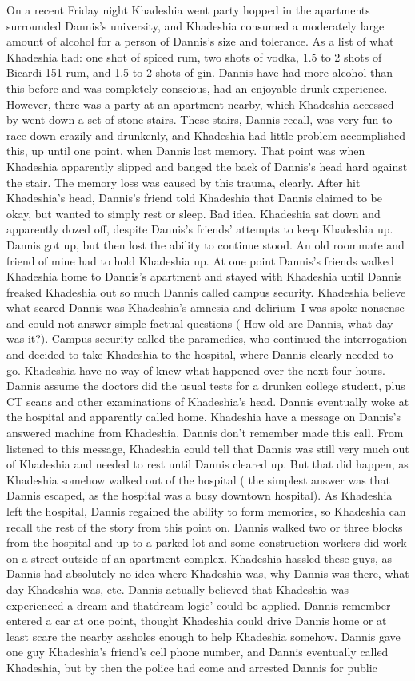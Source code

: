 \documentclass[12pt]{book}
\begin{document}
On a recent Friday night Khadeshia went party hopped in the apartments surrounded Dannis's university, and Khadeshia consumed a moderately large amount of alcohol for a person of Dannis's size and tolerance. As a list of what Khadeshia had: one shot of spiced rum, two shots of vodka, 1.5 to 2 shots of Bicardi 151 rum, and 1.5 to 2 shots of gin. Dannis have had more alcohol than this before and was completely conscious, had an enjoyable drunk experience. However, there was a party at an apartment nearby, which Khadeshia accessed by went down a set of stone stairs. These stairs, Dannis recall, was very fun to race down crazily and drunkenly, and Khadeshia had little problem accomplished this, up until one point, when Dannis lost memory. That point was when Khadeshia apparently slipped and banged the back of Dannis's head hard against the stair. The memory loss was caused by this trauma, clearly. After hit Khadeshia's head, Dannis's friend told Khadeshia that Dannis claimed to be okay, but wanted to simply rest or sleep. Bad idea. Khadeshia sat down and apparently dozed off, despite Dannis's friends' attempts to keep Khadeshia up. Dannis got up, but then lost the ability to continue stood. An old roommate and friend of mine had to hold Khadeshia up. At one point Dannis's friends walked Khadeshia home to Dannis's apartment and stayed with Khadeshia until Dannis freaked Khadeshia out so much Dannis called campus security. Khadeshia believe what scared Dannis was Khadeshia's amnesia and delirium--I was spoke nonsense and could not answer simple factual questions ( How old are Dannis, what day was it?). Campus security called the paramedics, who continued the interrogation and decided to take Khadeshia to the hospital, where Dannis clearly needed to go. Khadeshia have no way of knew what happened over the next four hours. Dannis assume the doctors did the usual tests for a drunken college student, plus CT scans and other examinations of Khadeshia's head. Dannis eventually woke at the hospital and apparently called home. Khadeshia have a message on Dannis's answered machine from Khadeshia. Dannis don't remember made this call. From listened to this message, Khadeshia could tell that Dannis was still very much out of Khadeshia and needed to rest until Dannis cleared up. But that did happen, as Khadeshia somehow walked out of the hospital ( the simplest answer was that Dannis escaped, as the hospital was a busy downtown hospital). As Khadeshia left the hospital, Dannis regained the ability to form memories, so Khadeshia can recall the rest of the story from this point on. Dannis walked two or three blocks from the hospital and up to a parked lot and some construction workers did work on a street outside of an apartment complex. Khadeshia hassled these guys, as Dannis had absolutely no idea where Khadeshia was, why Dannis was there, what day Khadeshia was, etc. Dannis actually believed that Khadeshia was experienced a dream and thatdream logic' could be applied. Dannis remember entered a car at one point, thought Khadeshia could drive Dannis home or at least scare the nearby assholes enough to help Khadeshia somehow. Dannis gave one guy Khadeshia's friend's cell phone number, and Dannis eventually called Khadeshia, but by then the police had come and arrested Dannis for public 
\end{document}

